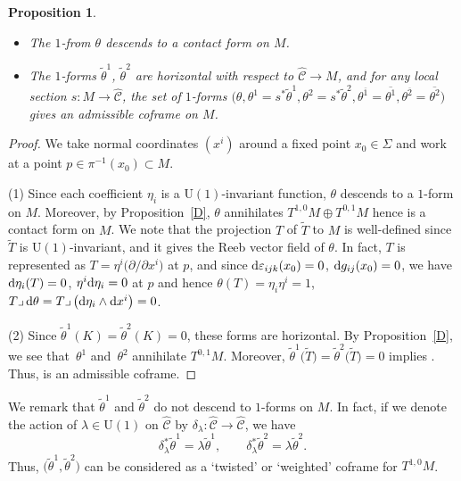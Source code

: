 \documentclass[pdftex]{sigma}
\renewcommand\d{\delta}
\newcommand\e{\varepsilon}
\renewcommand\th{\theta}
\newcommand\ol{\overline}
\newcommand{\wh}{\widehat}
\numberwithin{equation}{section}
\newtheorem{Proposition}[Theorem]{Proposition}
 { \theoremstyle{definition}
\newtheorem{Definition}[Theorem]{Definition}
\newtheorem*{Notation}{Notation}
\newtheorem{Example}[Theorem]{Example}
\newtheorem{Remark}[Theorem]{Remark} }
\begin{document}
\begin{Proposition}\quad
\begin{itemize}\itemsep=0pt
\item[$(1)$] The $1$-from $\th$ descends to a contact form on $M$.
\item[$(2)$] The $1$-forms $\tilde\th^1$, $\tilde\th^2$ are horizontal with respect to $\wh{\mathcal{C}}\to M$, and for any local section ${s\colon M\to \wh{\mathcal{C}}}$, the set of $1$-forms $\bigl(\th, \th^1=s^*\tilde\th^1, \th^2=s^*\tilde\th^2, \th^{\ol1}=\ol{\th^1}, \th^{\ol2}=\ol{\th^2}\bigr)$ gives an admissible coframe on $M$.
\end{itemize}
\end{Proposition}
\begin{proof}
We take normal coordinates $(x^i)$ around a fixed point $x_0\in \Sigma$ and work at a point $p\in\pi^{-1}(x_0)\subset M$.

(1) Since each coefficient $\eta_i$ is a $\mathrm{U}(1)$-invariant function, $\th$ descends to a $1$-form on $M$. Moreover, by Proposition~\ref{D}, $\th$ annihilates $T^{1, 0}M\oplus T^{0, 1}M$ hence is a contact form on $M$. We note that the projection $T$ of $\tilde T$ to $M$ is well-defined since $\tilde T$ is $\mathrm{U}(1)$-invariant, and it gives the Reeb vector field of $\th$. In fact, $T$ is represented as $T=\eta^i\bigl(\partial/\partial x^i\bigr)$ at $p$, and since
${\rm d}\e_{ijk}(x_0)=0$, ${\rm d}g_{ij}(x_0)=0$, we have ${\rm d}\eta_i(T)=0$, $\eta^i{\rm d}\eta_i=0$ at $p$ and hence $\th(T)=\eta_i\eta^i=1$, $T\lrcorner\, {\rm d}\th=T\lrcorner\, \bigl({\rm d}\eta_i\wedge {\rm d}x^i\bigr)=0$.

(2) Since $\tilde\th^1(K)=\tilde\th^2(K)=0$, these forms are horizontal. By Proposition~\ref{D}, we see that~$\th^1$ and~$\th^2$ annihilate $T^{0, 1}M$. Moreover, $\tilde\th^1\bigl(\tilde T\bigr)=\tilde\th^2\bigl(\tilde T\bigr)=0$ implies \smash{$\th^1(T)=\th^2(T)=0$}. Thus, \smash{$\bigl(\th, \th^1, \th^2, \th^{\ol1}, \th^{\ol2}\bigr)$} is an admissible coframe.
\end{proof}

We remark that $\tilde\th^1$ and $\tilde\th^2$ do not descend to $1$-forms on $M$. In fact, if we denote the action of $\lambda\in \mathrm{U}(1)$ on $\wh{\mathcal{C}}$ by $\d_\lambda\colon \wh{\mathcal{C}}\to \wh{\mathcal{C}}$, we have
\[
\d_\lambda^* \tilde\th^1=\lambda \tilde\th^1, \qquad \d_\lambda^*\tilde\th^2=\lambda\tilde\th^2.
\]
Thus, $\bigl(\tilde\th^1, \tilde\th^2\bigr)$ can be considered as a `twisted' or `weighted' coframe for $T^{1, 0}M$.
\end{document}
